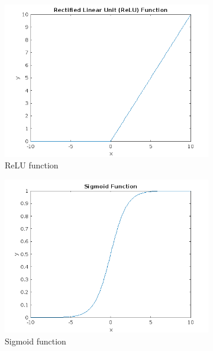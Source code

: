 \begin{figure}
    \centering
    \begin{subfigure}[b]{0.4\textwidth}
        \includegraphics[width=\textwidth]{figures/relu}
        \caption{ReLU function}
        \label{fig:relu}
    \end{subfigure}
    \hspace{0.1\textwidth}
    \begin{subfigure}[b]{0.4\textwidth}
        \includegraphics[width=\textwidth]{figures/sigmoid}
        \caption{Sigmoid function}
        \label{fig:sigmoid}
    \end{subfigure}
    \begin{subfigure}[b]{0.4\textwidth}

\end{subfigure}
\end{figure}
